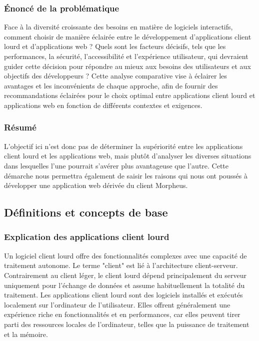 \documentclass[a4paper, 12pt, french]{article}
\begin{document}
			\subsubsection{Énoncé de la problématique}		
				Face à la diversité croissante des besoins en matière de logiciels interactifs, comment choisir de manière éclairée entre le développement d'applications client lourd et d'applications web ? Quels sont les facteurs décisifs, tels que les performances, la sécurité, l'accessibilité et l'expérience utilisateur, qui devraient guider cette décision pour répondre au mieux aux besoins des utilisateurs et aux objectifs des développeurs ? Cette analyse comparative vise à éclairer les avantages et les inconvénients de chaque approche, afin de fournir des recommandations éclairées pour le choix optimal entre applications client lourd et applications web en fonction de différents contextes et exigences.
	
			\subsubsection{Résumé}
				L'objectif ici n'est donc pas de déterminer la supériorité entre les applications client lourd et les applications web, mais plutôt d'analyser les diverses situations dans lesquelles l'une pourrait s'avérer plus avantageuse que l'autre. Cette démarche nous permettra également de saisir les raisons qui nous ont poussés à développer une application web dérivée du client Morpheus.				

		\subsection{Définitions et concepts de base}
			\subsubsection{Explication des applications client lourd}
				Un logiciel client lourd offre des fonctionnalités complexes avec une capacité de traitement autonome. Le terme "client" est lié à l'architecture client-serveur. Contrairement au client léger, le client lourd dépend principalement du serveur uniquement pour l'échange de données et assume habituellement la totalité du traitement. Les applications client lourd sont des logiciels installés et exécutés localement sur l'ordinateur de l'utilisateur. Elles offrent généralement une expérience riche en fonctionnalités et en performances, car elles peuvent tirer parti des ressources locales de l'ordinateur, telles que la puissance de traitement et la mémoire.
			
\end{document}
